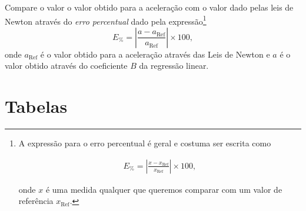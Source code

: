 \begin{question}[type={exam}]{2}
Compare o valor o valor obtido para a aceleração com o valor dado pelas leis de Newton através do \emph{erro percentual} dado pela expressão\footnote[][-5mm]{A expressão para o erro percentual é geral e costuma ser escrita como %
\begin{minipage}{\linewidth} %
\begin{align*} %
    E_\% = \left|\frac{x - x_{\textrm{Ref}}}{x_{\textrm{Ref}}}\right| \times 100, %
\end{align*} %
\vspace{0.1mm}
\end{minipage} %
%
onde $x$ é uma medida qualquer que queremos comparar com um valor de referência $x_{\text{Ref}}$.}
\begin{equation}
	E_\% = \left|\frac{a - a_{\textrm{Ref}}}{a_{\textrm{Ref}}}\right| \times 100,
\end{equation}
%
onde $a_{\textrm{Ref}}$ é o valor obtido para a aceleração através das Leis de Newton e $a$ é o valor obtido através do coeficiente $B$ da regressão linear.
\end{question}


\vfill
\pagebreak
\section{Tabelas}


